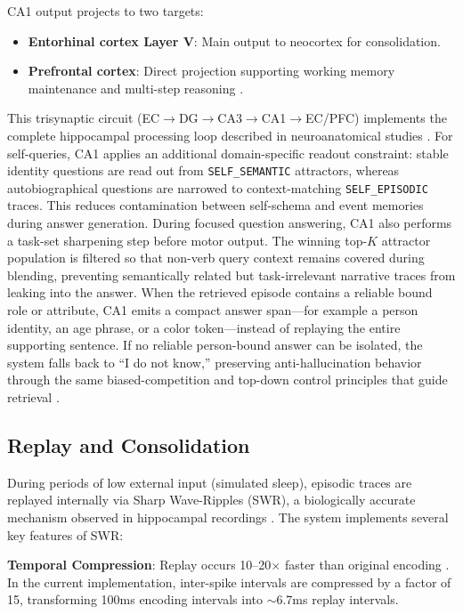 \documentclass[11pt]{article}
\begin{document}
CA1 output projects to two targets:
\begin{itemize}
\item \textbf{Entorhinal cortex Layer V}: Main output to neocortex for consolidation.
\item \textbf{Prefrontal cortex}: Direct projection supporting working memory maintenance
      and multi-step reasoning \citep{preston2013interplay}.
\end{itemize}

This trisynaptic circuit (EC$\rightarrow$DG$\rightarrow$CA3$\rightarrow$CA1$\rightarrow$EC/PFC)
implements the complete hippocampal processing loop described in neuroanatomical studies
\citep{amaral1989three}.
For self-queries, CA1 applies an additional domain-specific readout constraint: stable identity questions are read out from \texttt{SELF\_SEMANTIC} attractors, whereas autobiographical questions are narrowed to context-matching \texttt{SELF\_EPISODIC} traces. This reduces contamination between self-schema and event memories during answer generation.
During focused question answering, CA1 also performs a task-set sharpening step before motor output. The winning top-$K$ attractor population is filtered so that non-verb query context remains covered during blending, preventing semantically related but task-irrelevant narrative traces from leaking into the answer. When the retrieved episode contains a reliable bound role or attribute, CA1 emits a compact answer span---for example a person identity, an age phrase, or a color token---instead of replaying the entire supporting sentence. If no reliable person-bound answer can be isolated, the system falls back to ``I do not know,'' preserving anti-hallucination behavior through the same biased-competition and top-down control principles that guide retrieval \citep{miller2001integrative,desimone1995neural}.

\subsection{Replay and Consolidation}

During periods of low external input (simulated sleep), episodic traces are replayed internally
via Sharp Wave-Ripples (SWR), a biologically accurate mechanism observed in hippocampal recordings
\citep{buzsaki2015hippocampal}. The system implements several key features of SWR:

\textbf{Temporal Compression}: Replay occurs 10--20$\times$ faster than original encoding
\citep{nadasdy1999replay}. In the current implementation, inter-spike intervals are compressed
by a factor of 15, transforming 100ms encoding intervals into $\sim$6.7ms replay intervals.
\end{document}
